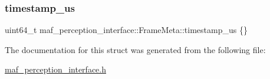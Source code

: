 \mbox{\label{structmaf__perception__interface_1_1FrameMeta_a30435302cfbe6a9d95e79ef1a7b26f26}} 
\subsubsection{\texorpdfstring{timestamp\+\_\+us}{timestamp\_us}}
{\footnotesize\ttfamily uint64\+\_\+t maf\+\_\+perception\+\_\+interface\+::\+Frame\+Meta\+::timestamp\+\_\+us \{\}}



The documentation for this struct was generated from the following file\+:\begin{DoxyCompactItemize}
\item 
\hyperlink{maf__perception__interface_8h}{maf\+\_\+perception\+\_\+interface.\+h}\end{DoxyCompactItemize}
